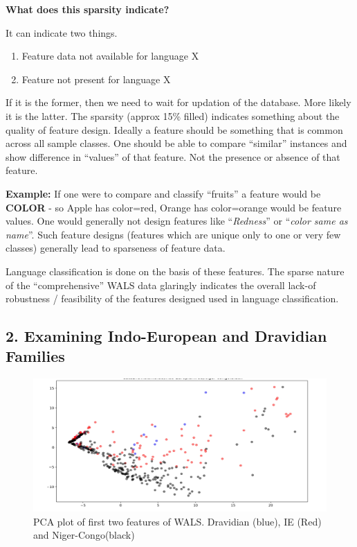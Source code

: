 \textbf{What does this sparsity indicate?}

It can indicate two things.

\begin{enumerate}[{\rm 1)}]
\itemsep=0pt
\item Feature data not available for language X

 \item Feature not present for language X

\end{enumerate}

If it is the former, then we need to wait for updation of the database. More likely it is the latter. The sparsity (approx 15\% filled) indicates something about the quality of feature design. Ideally a feature should be something that is common across all sample classes. One should be able to compare “similar” instances and show difference in “values” of that feature. Not the presence or absence of that feature.

\begin{myquote}
\textbf{Example:} If one were to compare and classify “fruits” a feature would be \textbf{COLOR} - so Apple has {color=red}, Orange has {color=orange} would be feature values. One would generally not design features like “\textit{Redness}” or “\textit{color same as name}”. Such feature designs (features which are unique only to one or very few classes) generally lead to sparseness of feature data.
\end{myquote}

Language classification is done on the basis of these features. The sparse nature of the “comprehensive” WALS data glaringly indicates the overall lack-of robustness / feasibility of the features designed used in language classification.


\subsection*{2. Examining Indo-European and Dravidian Families}

\begin{figure}[!htbp]
\includegraphics[scale=0.21]{images/6-03.jpg}
\caption{PCA plot of first two features of WALS. Dravidian (blue), IE (Red) and Niger-Congo(black)}\label{art6-fig03}
\end{figure}

